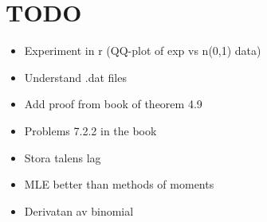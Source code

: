 \section{TODO}\par
\begin{itemize}
  \item Experiment in r (QQ-plot of exp vs n(0,1) data)
  \item Understand .dat files
  \item Add proof from book of theorem 4.9 
  \item Problems 7.2.2 in the book
  \item Stora talens lag
  \item MLE better than methods of moments
  \item Derivatan av binomial
\end{itemize}
